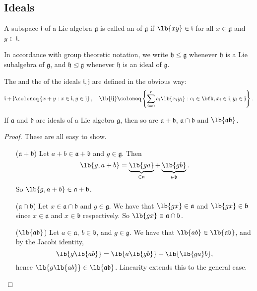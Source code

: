 \documentclass{article}
\newcommand*\tleq{\ensuremath{\mathrel{\unlhd}}}
\DeclarePairedDelimiter\lb\lbrack\rbrack
\newcommand*\frka{{\ensuremath{\mathfrak{a}}}}
\newcommand*\frkb{{\ensuremath{\mathfrak{b}}}}
\newcommand*\frkg{{\ensuremath{\mathfrak{g}}}}
\newcommand*\frkh{{\ensuremath{\mathfrak{h}}}}
\newcommand*\frki{{\ensuremath{\mathfrak{i}}}}
\newcommand*\frkj{{\ensuremath{\mathfrak{j}}}}
\begin{document}
\subsection{Ideals}

\begin{definition}
    A subspace $\frki$ of a Lie algebra $\frkg$ is called an  of $\frkg$ if $\lb{xy} \in \frki$ for all $x \in \frkg$ and $y \in \frki$.
\end{definition}

\begin{convention}
    In accordance with group theoretic notation, we write $\frkh \leq \frkg$ whenever $\frkh$ is a Lie subalgebra of $\frkg$, and $\frkh \tleq \frkg$ whenever $\frkh$ is an ideal of $\frkg$.
\end{convention}

The  and the  of the ideals $\frki, \frkj$ are defined in the obvious way:
\[
    \frki + \frkj
    \coloneq
    \left\{
        x + y : x \in \frki, y \in \frkj
    \right\},\quad
    \lb{\frki\frkj}
    \coloneq
    \left\{
        \sum_{i=0}^rc_i\lb{x_iy_i}
        :
        c_i \in \bfk, x_i \in \frki, y_i \in \frkj
    \right\}.
\]

\begin{theorem}
    If $\frka$ and $\frkb$ are ideals of a Lie algebra $\frkg$, then so are $\frka + \frkb$, $\frka \cap \frkb$ and $\lb{\frka\frkb}$.
\end{theorem}
\begin{proof}
    These are all easy to show.
    \begin{itemize}
        \item[($\frka+\frkb$)]
            Let $a + b \in \frka + \frkb$ and $g \in \frkg$.
            Then
            \[
                \lb{g,a+b}
                =
                \underbrace{
                    \lb{ga}
                }_{\in \frka}
                +
                \underbrace{
                    \lb{gb}
                }_{\in \frkb}.
            \]
            So $\lb{g,a+b} \in \frka+\frkb$.
        \item[($\frka \cap \frkb$)]
            Let $x \in \frka \cap \frkb$ and $g \in \frkg$.
            We have that $\lb{gx} \in \frka$ and $\lb{gx} \in \frkb$ since $x \in \frka$ and $x \in \frkb$ respectively.
            So $\lb{gx} \in \frka \cap \frkb$.
        \item[($\lb{\frka\frkb}$)]
            Let $a \in \frka$, $b \in \frkb$, and $g \in \frkg$.
            We have that $\lb{ab} \in \lb{\frka\frkb}$, and by the Jacobi identity,
            \[
                \lb{g\lb{ab}}
                =
                \lb{a\lb{gb}}
                +
                \lb{\lb{ga}b},
            \]
            hence $\lb{g\lb{ab}} \in \lb{\frka\frkb}$.
            Linearity extends this to the general case.
    \end{itemize}
\end{proof}
\end{document}
